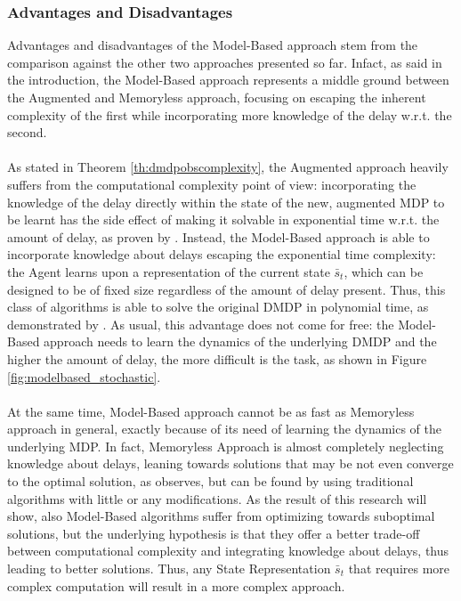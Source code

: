             \subsubsection{Advantages and Disadvantages}
                Advantages and disadvantages of the Model-Based approach stem from the comparison against the other two approaches presented so far. Infact, as said in the introduction, the Model-Based approach represents a middle ground between the Augmented and Memoryless approach, focusing on escaping the inherent complexity of the first while incorporating more knowledge of the delay w.r.t. the second. 
                \\\\
                As stated in Theorem \ref{th:dmdpobscomplexity}, the Augmented approach heavily suffers from the computational complexity point of view: incorporating the knowledge of the delay directly within the state of the new, augmented MDP to be learnt has the side effect of making it solvable in exponential time w.r.t. the amount of delay, as proven by . Instead, the Model-Based approach is able to incorporate knowledge about delays escaping the exponential time complexity: the Agent learns upon a representation of the current state $\bar{s}_t$, which can be designed to be of fixed size regardless of the amount of delay present. Thus, this class of algorithms is able to solve the original DMDP in polynomial time, as demonstrated by . As usual, this advantage does not come for free: the Model-Based approach needs to learn the dynamics of the underlying DMDP and the higher the amount of delay, the more difficult is the task, as shown in Figure \ref{fig:modelbased_stochastic}.
                \\\\
                At the same time, Model-Based approach cannot be as fast as Memoryless approach in general, exactly because of its need of learning the dynamics of the underlying MDP. In fact, Memoryless Approach is almost completely neglecting knowledge about delays, leaning towards solutions that may be not even converge to the optimal solution, as  observes, but can be found by using traditional algorithms with little or any modifications. As the result of this research will show, also Model-Based algorithms suffer from optimizing towards suboptimal solutions, but the underlying hypothesis is that they offer a better trade-off between computational complexity and integrating knowledge about delays, thus leading to better solutions. Thus, any State Representation $\bar{s}_t$ that requires more complex computation will result in a more complex approach.
